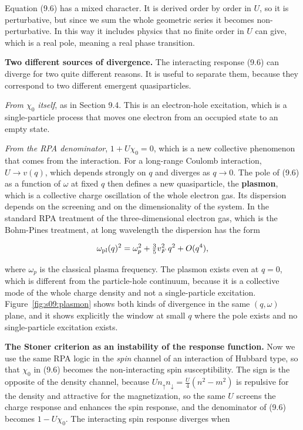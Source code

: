 Equation (9.6) has a mixed character. It is derived order by order in $U$, so it is perturbative,
but since we sum the whole geometric series it becomes non-perturbative. In this way it includes
physics that no finite order in $U$ can give, which is a real pole, meaning a real phase transition.

\textbf{Two different sources of divergence.} The interacting response (9.6) can diverge for two quite
different reasons. It is useful to separate them, because they correspond to two different emergent
quasiparticles.

\emph{From $\chi_0$ itself}, as in Section 9.4. This is an electron-hole excitation, which is a
single-particle process that moves one electron from an occupied state to an empty state.

\emph{From the RPA denominator}, $1+U\chi_0=0$, which is a new collective phenomenon that comes from
the interaction. For a long-range Coulomb interaction, $U \to v(q)$, which depends strongly on $q$
and diverges as $q\to0$. The pole of (9.6) as a function of $\omega$ at fixed $q$ then defines a new
quasiparticle, the \textbf{plasmon}, which is a collective charge oscillation of the whole electron
gas. Its dispersion depends on the screening and on the dimensionality of the system. In the standard
RPA treatment of the three-dimensional electron gas, which is the Bohm-Pines treatment, at long
wavelength the dispersion has the form

\begin{equation}
\omega_{\rm pl}(q)^2 = \omega_p^2 + \tfrac{3}{5} v_F^2\, q^2 + O(q^4),
\end{equation}

where $\omega_p$ is the classical plasma frequency. The plasmon exists even at $q=0$, which is
different from the particle-hole continuum, because it is a collective mode of the whole charge
density and not a single-particle excitation. Figure~\ref{fig:s09:plasmon} shows both kinds of
divergence in the same $(q,\omega)$ plane, and it shows explicitly the window at small $q$ where the
pole exists and no single-particle excitation exists.



\textbf{The Stoner criterion as an instability of the response function.} Now we use the same RPA logic
in the \emph{spin} channel of an interaction of Hubbard type, so that $\chi_0$ in (9.6) becomes the
non-interacting spin susceptibility. The sign is the opposite of the density channel, because
$U n_\uparrow n_\downarrow = \tfrac{U}{4}(n^2 - m^2)$ is repulsive for the density and attractive for the
magnetization, so the same $U$ screens the charge response and enhances the spin response, and the
denominator of (9.6) becomes $1-U\chi_0$. The interacting spin response diverges when

